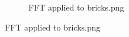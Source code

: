 \begin{figure}[H]
\begin{subfigure}{0.5\textwidth}
        \caption{FFT applied to bricks.png}
    \end{subfigure}
\end{figure}

